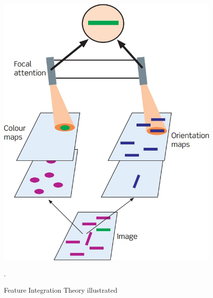 \begin{figure}[h!]
	\centering
	\includegraphics[width=\textwidth]{figures/feature_integration_theory.jpg}
	\caption{Feature Integration Theory illustrated \cite{snowden2012basic}}.\label{fig:feature_integration_theory}
\end{figure}

